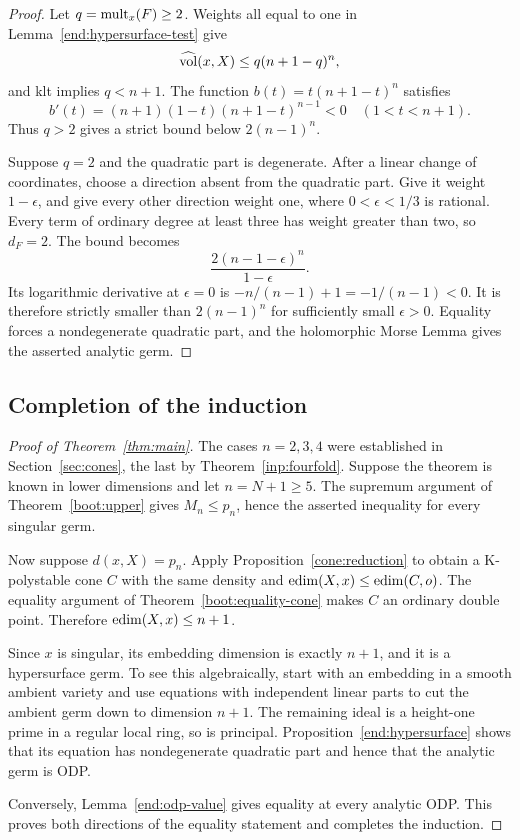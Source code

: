\begin{proof}
Let \(q=\operatorname{mult}_x(F)\ge2\). Weights all equal to one in
Lemma~\ref{end:hypersurface-test} give
\[
                        \widehat{\operatorname{vol}}(x,X)\le q(n+1-q)^n,
\]
and klt implies \(q<n+1\). The function
\(b(t)=t(n+1-t)^n\) satisfies
\[
 b'(t)=(n+1)(1-t)(n+1-t)^{n-1}<0
                         \quad(1<t<n+1).
\]
Thus \(q>2\) gives a strict bound below \(2(n-1)^n\).

Suppose \(q=2\) and the quadratic part is degenerate.
After a linear change of coordinates, choose a direction
absent from the quadratic part. Give it weight
\(1-\epsilon\), and give every other direction weight one,
where \(0<\epsilon<1/3\) is rational. Every term of
ordinary degree at least three has weight greater than
two, so \(d_F=2\). The bound becomes
\[
             \frac{2(n-1-\epsilon)^n}{1-\epsilon}.
\]
Its logarithmic derivative at \(\epsilon=0\) is
\(-n/(n-1)+1=-1/(n-1)<0\). It is therefore strictly
smaller than \(2(n-1)^n\) for sufficiently small
\(\epsilon>0\). Equality forces a nondegenerate
quadratic part, and the holomorphic Morse Lemma gives
the asserted analytic germ.
\end{proof}

\subsection{Completion of the induction}

\begin{proof}[Proof of Theorem~\ref{thm:main}]
The cases \(n=2,3,4\) were established in
Section~\ref{sec:cones}, the last by
Theorem~\ref{inp:fourfold}. Suppose the theorem is
known in lower dimensions and let \(n=N+1\ge5\).
The supremum argument of Theorem~\ref{boot:upper}
gives \(M_n\le p_n\), hence the asserted inequality
for every singular germ.

Now suppose \(d(x,X)=p_n\). Apply
Proposition~\ref{cone:reduction} to obtain a
K-polystable cone \(C\) with the same density and
\(\operatorname{edim}(X,x)\le\operatorname{edim}(C,o)\).
The equality argument of
Theorem~\ref{boot:equality-cone} makes \(C\) an
ordinary double point. Therefore
\(\operatorname{edim}(X,x)\le n+1\).

Since \(x\) is singular, its embedding dimension is
exactly \(n+1\), and it is a hypersurface germ.
To see this algebraically, start with an embedding
in a smooth ambient variety and use equations with
independent linear parts to cut the ambient germ
down to dimension \(n+1\). The remaining ideal is a
height-one prime in a regular local ring, so is
principal. Proposition~\ref{end:hypersurface}
shows that its equation has nondegenerate quadratic
part and hence that the analytic germ is ODP.

Conversely, Lemma~\ref{end:odp-value} gives equality
at every analytic ODP. This proves both directions
of the equality statement and completes the induction.
\end{proof}

